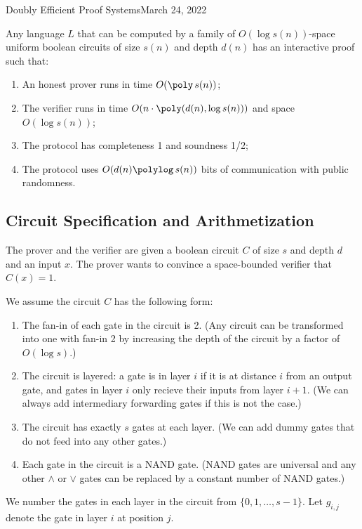 \begin{lecture}{9}{Doubly Efficient Proof Systems}{March 24, 2022}
\begin{theorem}\label{thm:main}
  Any language $L$ that can be computed by a family of $O(\log s(n))$-space
  uniform boolean circuits of size $s(n)$ and depth $d(n)$ has an interactive
  proof such that:
	\begin{enumerate}
		\item An honest prover runs in time $O(\poly\,{s(n)})$;
		\item The verifier runs in time $O(n \cdot \poly(d(n), \log s(n)))$ and space $O(\log s(n))$;
		\item The protocol has completeness 1 and soundness 1/2;
    \item The protocol uses $O(d(n)\polylog\,{s(n)})$ bits of communication with
      public randomness.
  \end{enumerate}
\end{theorem}

\subsection{Circuit Specification and Arithmetization}

The prover and the verifier are given a boolean circuit $C$ of size $s$ and
depth $d$ and an input $x$. The prover wants to convince a space-bounded
verifier that $C(x) = 1$.

We assume the circuit $C$ has the following form:
\begin{enumerate}
  \item The fan-in of each gate in the circuit is 2. (Any circuit can be
    transformed into one with fan-in 2 by increasing the depth of the circuit
    by a factor of $O(\log s)$.)
  \item The circuit is layered: a gate is in layer $i$ if it is at distance $i$
    from an output gate, and gates in layer $i$ only recieve their inputs from
    layer $i + 1$. (We can always add intermediary forwarding gates if this is
    not the case.)
  \item The circuit has exactly $s$ gates at each layer. (We can add dummy
    gates that do not feed into any other gates.)
  \item Each gate in the circuit is a NAND gate. (NAND gates are universal and
    any other $\wedge$ or $\vee$ gates can be replaced by a constant number of
    NAND gates.)
\end{enumerate}

We number the gates in each layer in the circuit from $\{0,1,\ldots, s-1\}$.
Let $g_{i,j}$ denote the gate in layer $i$ at position $j$.


\end{lecture}
